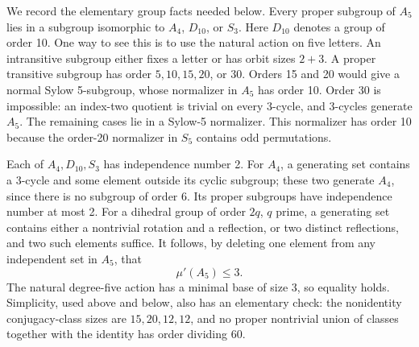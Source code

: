 \documentclass[11pt]{article}
\theoremstyle{remark}\newtheorem{remark}[theorem]{Remark}
\newcommand{\mup}{\mu'}
\begin{document}
We record the elementary group facts needed below. Every proper subgroup of
$A_5$ lies in a subgroup isomorphic to $A_4$, $D_{10}$, or $S_3$. Here $D_{10}$
denotes a group of order 10. One way to see this is to use the natural action
on five letters. An intransitive subgroup either fixes a letter or has orbit
sizes $2+3$. A proper transitive subgroup has order $5,10,15,20$, or $30$.
Orders 15 and 20 would give a normal Sylow 5-subgroup, whose normalizer in
$A_5$ has order 10. Order 30 is impossible: an index-two quotient is trivial
on every 3-cycle, and 3-cycles generate $A_5$. The remaining cases lie in a
Sylow-5 normalizer. This normalizer has order 10 because the order-20
normalizer in $S_5$ contains odd permutations.

Each of $A_4,D_{10},S_3$ has independence number 2. For $A_4$, a generating
set contains a 3-cycle and some element outside its cyclic subgroup; these
two generate $A_4$, since there is no subgroup of order 6. Its proper
subgroups have independence number at most 2. For a dihedral group of order
$2q$, $q$ prime, a generating set contains either a nontrivial rotation and
a reflection, or two distinct reflections, and two such elements suffice.
It follows, by deleting one element from any independent set in $A_5$, that
\begin{equation}\label{eq:A5rank}
                        \mup(A_5)\le3.
\end{equation}
The natural degree-five action has a minimal base of size 3, so equality holds.
Simplicity, used above and below, also has an elementary check: the nonidentity
conjugacy-class sizes are $15,20,12,12$, and no proper nontrivial union of
classes together with the identity has order dividing 60.
\end{document}
